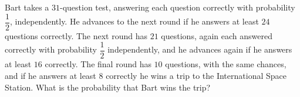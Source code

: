Bart takes a $31$-question test, answering each question correctly with probability $\dfrac12$, independently. He advances to the next round if he answers at least $24$ questions correctly. The next round has $21$ questions, again each answered correctly with probability $\dfrac12$ independently, and he advances again if he answers at least $16$ correctly. The final round has $10$ questions, with the same chances, and if he answers at least $8$ correctly he wins a trip to the International Space Station. What is the probability that Bart wins the trip?

